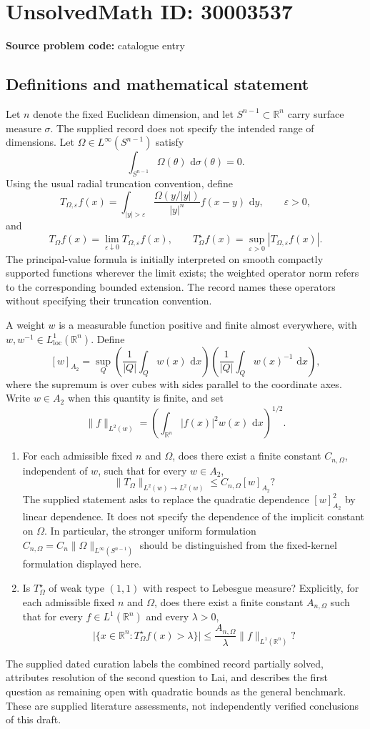 \documentclass[11pt]{article}
\newcommand{\R}{\mathbb{R}}
\newcommand{\dd}{\,\mathrm{d}}
\begin{document}
\section*{UnsolvedMath ID: 30003537}
\textbf{Source problem code:} catalogue entry
\subsection{Definitions and mathematical statement}
Let \(n\) denote the fixed Euclidean dimension, and let \(S^{n-1}\subset\R^n\) carry surface measure \(\sigma\). The supplied record does not specify the intended range of dimensions. Let \(\Omega\in L^\infty(S^{n-1})\) satisfy
\[
\int_{S^{n-1}}\Omega(\theta)\,\dd\sigma(\theta)=0.
\]
Using the usual radial truncation convention, define
\[
T_{\Omega,\varepsilon}f(x)
=\int_{|y|>\varepsilon}\frac{\Omega(y/|y|)}{|y|^n}f(x-y)\,\dd y,
\qquad \varepsilon>0,
\]
and
\[
T_\Omega f(x)=\lim_{\varepsilon\downarrow0}T_{\Omega,\varepsilon}f(x),
\qquad
T_\Omega^\star f(x)=\sup_{\varepsilon>0}|T_{\Omega,\varepsilon}f(x)|.
\]
The principal-value formula is initially interpreted on smooth compactly supported functions wherever the limit exists; the weighted operator norm refers to the corresponding bounded extension. The record names these operators without specifying their truncation convention.

A weight \(w\) is a measurable function positive and finite almost everywhere, with \(w,w^{-1}\in L^1_{\mathrm{loc}}(\R^n)\). Define
\[
[w]_{A_2}=\sup_Q
\left(\frac{1}{|Q|}\int_Qw(x)\,\dd x\right)
\left(\frac{1}{|Q|}\int_Qw(x)^{-1}\,\dd x\right),
\]
where the supremum is over cubes with sides parallel to the coordinate axes. Write \(w\in A_2\) when this quantity is finite, and set
\[
\|f\|_{L^2(w)}=\left(\int_{\R^n}|f(x)|^2w(x)\,\dd x\right)^{1/2}.
\]

\begin{enumerate}
\item For each admissible fixed \(n\) and \(\Omega\), does there exist a finite constant \(C_{n,\Omega}\), independent of \(w\), such that for every \(w\in A_2\),
\[
\|T_\Omega\|_{L^2(w)\to L^2(w)}\le C_{n,\Omega}[w]_{A_2}?
\]
The supplied statement asks to replace the quadratic dependence \([w]_{A_2}^2\) by linear dependence. It does not specify the dependence of the implicit constant on \(\Omega\). In particular, the stronger uniform formulation \(C_{n,\Omega}=C_n\|\Omega\|_{L^\infty(S^{n-1})}\) should be distinguished from the fixed-kernel formulation displayed here.
\item Is \(T_\Omega^\star\) of weak type \((1,1)\) with respect to Lebesgue measure? Explicitly, for each admissible fixed \(n\) and \(\Omega\), does there exist a finite constant \(A_{n,\Omega}\) such that for every \(f\in L^1(\R^n)\) and every \(\lambda>0\),
\[
\bigl|\{x\in\R^n:T_\Omega^\star f(x)>\lambda\}\bigr|
\le \frac{A_{n,\Omega}}{\lambda}\|f\|_{L^1(\R^n)}?
\]
\end{enumerate}
The supplied dated curation labels the combined record partially solved, attributes resolution of the second question to Lai, and describes the first question as remaining open with quadratic bounds as the general benchmark. These are supplied literature assessments, not independently verified conclusions of this draft.
\end{document}
